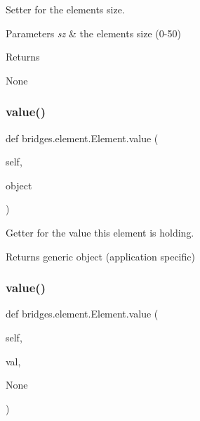 Setter for the element\textquotesingle{}s size. 


\begin{DoxyParams}{Parameters}
{\em sz} & the element\textquotesingle{}s size (0-\/50) \\
\hline
\end{DoxyParams}
\begin{DoxyReturn}{Returns}


None 
\end{DoxyReturn}
\mbox{\label{classbridges_1_1element_1_1_element_ab89d51b751ad0956d7ec855c35335ad2}} 
\subsubsection{\texorpdfstring{value()}{value()}\hspace{0.1cm}{\footnotesize\ttfamily [1/2]}}
{\footnotesize\ttfamily def bridges.\+element.\+Element.\+value (\begin{DoxyParamCaption}\item[{}]{self,  }\item[{}]{object }\end{DoxyParamCaption})}



Getter for the value this element is holding. 

\begin{DoxyReturn}{Returns}
generic object (application specific) 
\end{DoxyReturn}
\mbox{\label{classbridges_1_1element_1_1_element_a810c122a8b900f476601d565291bdbf8}} 
\subsubsection{\texorpdfstring{value()}{value()}\hspace{0.1cm}{\footnotesize\ttfamily [2/2]}}
{\footnotesize\ttfamily def bridges.\+element.\+Element.\+value (\begin{DoxyParamCaption}\item[{}]{self,  }\item[{}]{val,  }\item[{}]{None }\end{DoxyParamCaption})}



